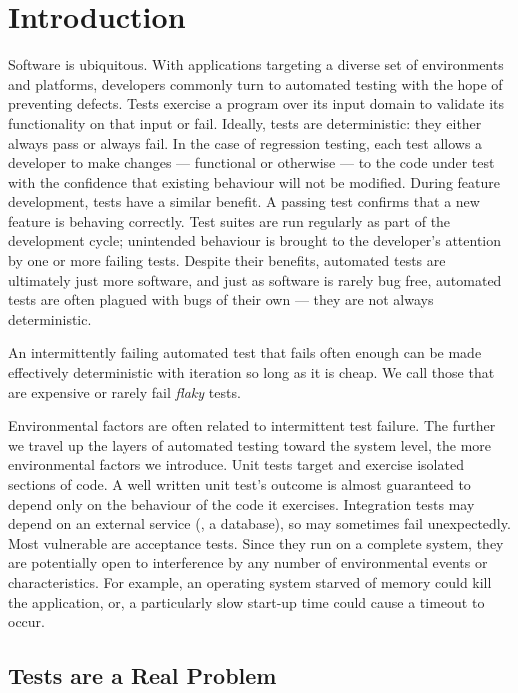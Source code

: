 \section{Introduction}
\label{sec:intro}

Software is ubiquitous. With applications targeting a diverse set of
environments and platforms, developers commonly turn to automated testing with
the hope of preventing defects. Tests exercise a program over its input domain
to validate its functionality on that input or fail. Ideally, tests are
deterministic: they either always pass or always fail. In the case of regression
testing, each test allows a developer to make changes --- functional or
otherwise --- to the code under test with the confidence that existing behaviour
will not be modified. During feature development, tests have a similar benefit.
A passing test confirms that a new feature is behaving correctly. Test suites
are run regularly as part of the development cycle; unintended behaviour is
brought to the developer's attention by one or more failing tests. Despite their
benefits, automated tests are ultimately just more software, and just as
software is rarely bug free, automated tests are often plagued with bugs of
their own --- they are not always deterministic.

An intermittently failing automated test that fails often enough can be made
effectively deterministic with iteration so long as it is cheap. We call those
that are expensive or rarely fail \emph{flaky} tests.

Environmental factors are often related to intermittent test failure. The
further we travel up the layers of automated testing toward the system level,
the more environmental factors we introduce. Unit tests target and exercise
isolated sections of code. A well written unit test's outcome is almost
guaranteed to depend only on the behaviour of the code it exercises. Integration
tests may depend on an external service (\eg, a database), so may sometimes fail
unexpectedly. Most vulnerable are acceptance tests. Since they run on a complete
system, they are potentially open to interference by any number of environmental
events or characteristics. For example, an operating system starved of memory
could kill the application, or, a particularly slow start-up time could cause a
timeout to occur.

\subsection{\Flaky Tests are a Real Problem}

